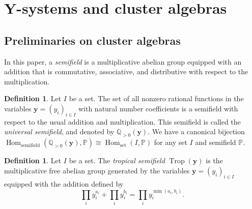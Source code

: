\documentclass[10pt,a4paper]{amsart}
\numberwithin{equation}{section}
\theoremstyle{definition}
\newtheorem{Definition}[Theorem]{Definition}
\DeclareMathOperator{\Hom}{Hom}
\DeclareMathOperator{\Trop}{Trop}
\begin{document}
\section[Y-systems and cluster algebras]{$\boldsymbol{ Y}$-systems and cluster algebras}
\subsection{Preliminaries on cluster algebras}
\label{section:Y from cluster}
In this paper, a \emph{semifield} is a multiplicative abelian group equipped with an addition that is commutative,
associative, and distributive with respect to the multiplication.

\begin{Definition}
 Let $I$ be a set.
 The set of all nonzero rational functions in the variables $\boldsymbol{y} = (y_i)_{i \in I}$ with
 natural number coefficients is a semifield with respect to the usual addition and multiplication.
 This semifield is called the \emph{universal semifield}, and denoted by $\mathbb{Q}_{>0} (\boldsymbol{y})$.
 We have a canonical bijection
 $\Hom_{\mathrm{semifield}} (\mathbb{Q}_{>0} (\boldsymbol{y}), \mathbb{P}) \cong \Hom_{\mathrm{set}} (I, \mathbb{P})$
 for any set $I$ and semifield $\mathbb{P}$.
\end{Definition}

\begin{Definition}
 Let $I$ be a set.
 The \emph{tropical semifield} $\Trop(\boldsymbol{y})$ is the multiplicative free abelian group
 generated by the variables $\boldsymbol{y} = (y_i)_{i \in I}$ equipped with the addition defined by
 \begin{equation*}
 \prod_i y_i^{a_i} +
 \prod_i y_i^{b_i} =
 \prod_i y_i^{\min(a_i,b_i)}.
 \end{equation*}
\end{Definition}
\end{document}
